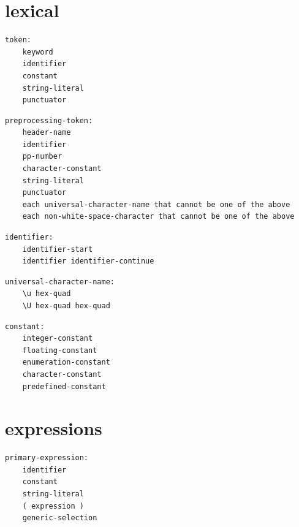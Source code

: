 
\section{lexical}

\noindent\textbf{\texttt{}}\par
\begin{lstlisting}
token:
    keyword
    identifier
    constant
    string-literal
    punctuator
\end{lstlisting}

\noindent\textbf{\texttt{}}\par
\begin{lstlisting}
preprocessing-token:
    header-name
    identifier
    pp-number
    character-constant
    string-literal
    punctuator
    each universal-character-name that cannot be one of the above
    each non-white-space-character that cannot be one of the above
\end{lstlisting}

\noindent\textbf{\texttt{}}\par
\begin{lstlisting}
identifier:
    identifier-start
    identifier identifier-continue
\end{lstlisting}

\noindent\textbf{\texttt{}}\par
\begin{lstlisting}
universal-character-name:
    \u hex-quad
    \U hex-quad hex-quad
\end{lstlisting}

\noindent\textbf{\texttt{}}\par
\begin{lstlisting}
constant:
    integer-constant
    floating-constant
    enumeration-constant
    character-constant
    predefined-constant
\end{lstlisting}

\section{expressions}

\noindent\textbf{\texttt{}}\par
\begin{lstlisting}
primary-expression:
    identifier
    constant
    string-literal
    ( expression )
    generic-selection
\end{lstlisting}


